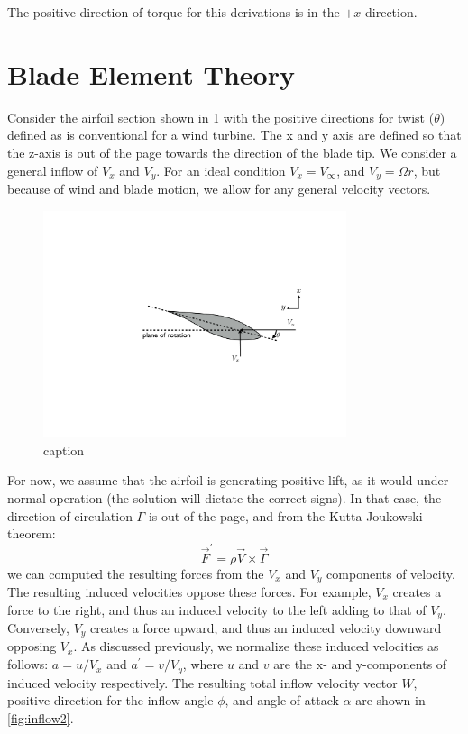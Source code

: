 \documentclass{article}
\begin{document}
The positive direction of torque for this derivations is in the $+x$ direction.

\section{Blade Element Theory}
\label{sec:be}

Consider the airfoil section shown in \cref{fig:inflow1} with the positive directions for twist ($\theta$) defined as is conventional for a wind turbine.  The x and y axis are defined so that the z-axis is out of the page towards the direction of the blade tip.  We consider a general inflow of $V_x$ and $V_y$.  For an ideal condition $V_x = V_\infty$, and $V_y = \Omega r$, but because of wind and blade motion, we allow for any general velocity vectors.

\begin{figure}[htbp]
\centering
\includegraphics[width=3.5in]{figures/inflow1}
\caption{caption}
\label{fig:inflow1}
\end{figure}

For now, we assume that the airfoil is generating positive lift, as it would under normal operation (the solution will dictate the correct signs).  In that case, the direction of circulation $\Gamma$ is out of the page, and from the Kutta-Joukowski theorem:
\begin{equation}
    \vec{F}^\prime = \rho \vec{V} \times \vec{\Gamma}
\end{equation}
we can computed the resulting forces from the $V_x$ and $V_y$ components of velocity.  The resulting induced velocities oppose these forces.  For example, $V_x$ creates a force to the right, and thus an induced velocity to the left adding to that of $V_y$.  Conversely, $V_y$ creates a force upward, and thus an induced velocity downward opposing $V_x$.  As discussed previously, we normalize these induced velocities as follows: $a = u/V_x$ and $a^\prime = v/V_y$, where $u$ and $v$ are the x- and y-components of induced velocity respectively.  The resulting total inflow velocity vector $W$, positive direction for the inflow angle $\phi$, and angle of attack $\alpha$ are shown in \cref{fig:inflow2}.
\end{document}
